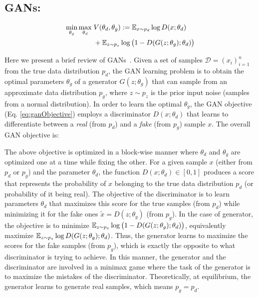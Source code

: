 \subsection*{GANs:} 


\begin{align}\label{eq:ganObjective}
     \min_{\theta_g}\max_{\theta_d}\; & V(\theta_d, \theta_g) := \operatorname{\mathbb{E}}_{x \sim p_{d}} \log D(x; \theta_d) \nonumber \\&
     + \operatorname{\mathbb{E}}_{z \sim p_z } \log \big( 1 - D(G(z; \theta_g) ; \theta_d)\big) 
\end{align}



Here we present a brief review of GANs~\cite{goodfellow2014generative}. Given a set of samples $\mathcal{D} = (x_i)_{i=1}^n$ from the true data distribution $p_d$, the GAN learning problem is to obtain the optimal parameters $\theta_g$ of a generator $G(z;\theta_g)$ that can sample from an approximate data distribution $p_g$, where $z \sim p_z$ is the prior input noise (\eg samples from a normal distribution). In order to learn the optimal $\theta_g$, the GAN objective (Eq. \eqref{eq:ganObjective}) employs a discriminator $D(x; \theta_d)$ that learns to differentiate between a {\em real} (from $p_d$) and a {\em fake} (from $p_g$) sample $x$. The overall GAN objective is:


The above objective is optimized in a block-wise manner where $\theta_d$ and $\theta_g$ are optimized one at a time while fixing the other. For a given sample $x$ (either from $p_d$ or $p_g$) and the parameter $\theta_d$, the function $D(x; \theta_d) \in [0, 1]$ produces a score that represents the probability of $x$ belonging to the true data distribution $p_d$ (or probability of it being real). The objective of the discriminator is to learn parameters $\theta_d$ that maximizes this score for the true samples (from $p_d$) while minimizing it for the fake ones $\tilde{x} = D(z; \theta_g)$ (from $p_g$). In the case of generator, the objective is to minimize $\operatorname{\mathbb{E}}_{z \sim p_z}\log \big( 1 - D(G(z; \theta_g) ; \theta_d) \big)$, equivalently maximize $\operatorname{\mathbb{E}}_{z \sim p_z} \log D(G(z; \theta_g) ; \theta_d)$. Thus, the generator learns to maximize the scores for the fake samples (from $p_g$), which is exactly the opposite to what discriminator is trying to achieve. In this manner, the generator and the discriminator are involved in a minimax game where the task of the generator is to maximize the mistakes of the discriminator. Theoretically, at equilibrium, the generator learns to generate real samples, which means $p_g = p_d$.

